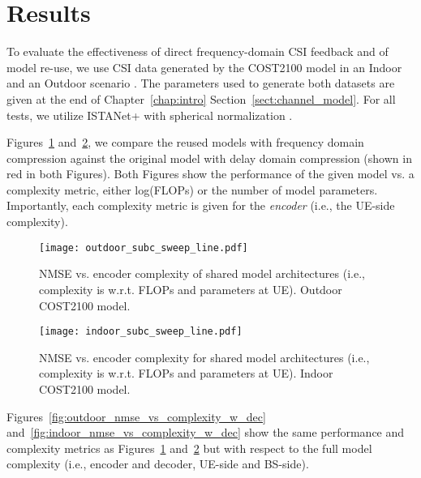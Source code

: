 \section{Results} \label{sect:direct_reuse_results}

To evaluate the effectiveness of direct frequency-domain CSI feedback and of model re-use, we use CSI data generated by the COST2100 model in an Indoor and an Outdoor scenario \cite{ref:liu2012cost2100}. The parameters used to generate both datasets are given at the end of Chapter~\ref{chap:intro} Section~\ref{sect:channel_model}. For all tests, we utilize ISTANet+ with spherical normalization \cite{ref:liu2020sphnet}.%

Figures~\ref{fig:outdoor_nmse_vs_complexity} and~\ref{fig:indoor_nmse_vs_complexity}, we compare the reused models with frequency domain compression against the original model with delay domain compression (shown in {\color{red}red} in both Figures). Both Figures show the performance of the given model vs. a complexity metric, either log(FLOPs) or the number of model parameters. Importantly, each complexity metric is given for the \emph{encoder} (i.e., the UE-side complexity).

\begin{figure}[!hbtp]
    \centering
    \texttt{[image: outdoor\_subc\_sweep\_line.pdf]}
    \caption{NMSE vs. encoder complexity of shared model architectures (i.e., complexity is w.r.t. FLOPs and parameters at UE). Outdoor COST2100 model.}
    \label{fig:outdoor_nmse_vs_complexity}
\end{figure}

\begin{figure}[!hbtp]
    \centering
    \texttt{[image: indoor\_subc\_sweep\_line.pdf]}
    \caption{NMSE vs. encoder complexity for shared model architectures (i.e., complexity is w.r.t. FLOPs and parameters at UE). Indoor COST2100 model.}
    \label{fig:indoor_nmse_vs_complexity}
\end{figure}

Figures~\ref{fig:outdoor_nmse_vs_complexity_w_dec} and~\ref{fig:indoor_nmse_vs_complexity_w_dec} show the same performance and complexity metrics as Figures~\ref{fig:outdoor_nmse_vs_complexity} and~\ref{fig:indoor_nmse_vs_complexity} but with respect to the full model complexity (i.e., encoder and decoder, UE-side and BS-side).

